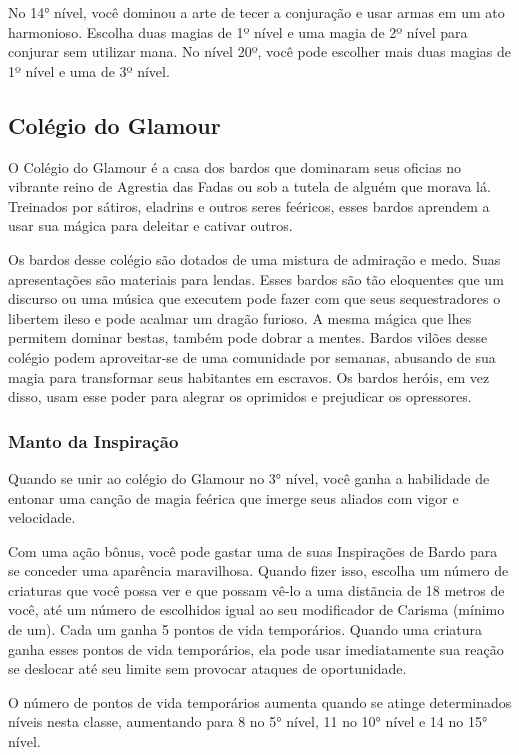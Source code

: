 \documentclass{RPG_Adventure}[2021/10/20]
\begin{document}
\begin{multicols}{2}
No 14° nível, você dominou a arte de tecer a conjuração e usar armas em um ato
harmonioso. Escolha duas magias de 1º nível e uma magia de 2º nível para
conjurar sem utilizar mana. No nível 20º, você pode escolher mais duas magias de
1º nível e uma de 3º nível.

\subsection*{Colégio do Glamour}%

O Colégio do Glamour é a casa dos bardos que dominaram seus oficias no vibrante
reino de Agrestia das Fadas ou sob a tutela de alguém que morava lá.  Treinados
por sátiros, eladrins e outros seres feéricos, esses bardos aprendem a usar sua
mágica para deleitar e cativar outros.

Os bardos desse colégio são dotados de uma mistura de admiração e medo. Suas
apresentações são materiais para lendas. Esses bardos são tão eloquentes que um
discurso ou uma música que executem pode fazer com que seus sequestradores o
libertem ileso e pode acalmar um dragão furioso. A mesma mágica que lhes
permitem dominar bestas, também pode dobrar a mentes. Bardos vilões desse
colégio podem aproveitar-se de uma comunidade por semanas, abusando de sua
magia para transformar seus habitantes em escravos. Os bardos heróis, em vez
disso, usam esse poder para alegrar os oprimidos e prejudicar os opressores.

\subsubsection{Manto da Inspiração}%

Quando se unir ao colégio do Glamour no 3° nível, você ganha a habilidade de
entonar uma canção de magia feérica que imerge seus aliados com vigor e
velocidade.

Com uma ação bônus, você pode gastar uma de suas Inspirações de Bardo para se
conceder uma aparência maravilhosa. Quando fizer isso, escolha um número de
criaturas que você possa ver e que possam vê-lo a uma distãncia de 18 metros de
você, até um número de escolhidos igual ao seu modificador de Carisma (mínimo de
um). Cada um ganha 5 pontos de vida temporários. Quando uma criatura ganha
esses pontos de vida temporários, ela pode usar imediatamente sua reação se
deslocar até seu limite sem provocar ataques de oportunidade.

O número de pontos de vida temporários aumenta quando se atinge determinados
níveis nesta classe, aumentando para 8 no 5° nível, 11 no 10° nível e 14 no 15°
nível.


\end{multicols}
\end{document}
